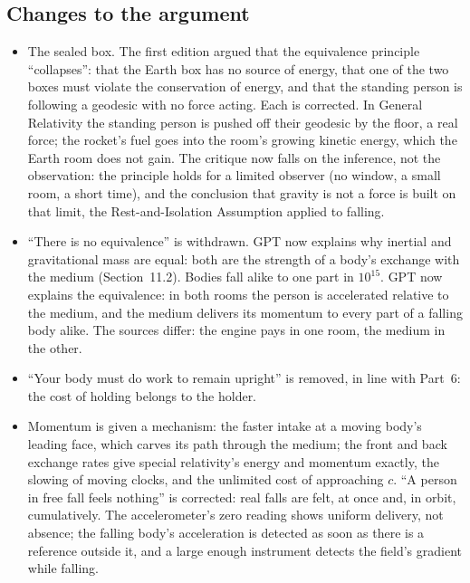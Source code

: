 \documentclass[11pt,a4paper]{article}
\begin{document}
\subsection*{Changes to the argument}
\begin{itemize}
  \item The sealed box. The first edition argued that the equivalence principle ``collapses'': that the Earth box has no source of energy, that one of the two boxes must violate the conservation of energy, and that the standing person is following a geodesic with no force acting. Each is corrected. In General Relativity the standing person is pushed off their geodesic by the floor, a real force; the rocket's fuel goes into the room's growing kinetic energy, which the Earth room does not gain. The critique now falls on the inference, not the observation: the principle holds for a limited observer (no window, a small room, a short time), and the conclusion that gravity is not a force is built on that limit, the Rest-and-Isolation Assumption applied to falling.
  \item ``There is no equivalence'' is withdrawn. GPT now explains why inertial and gravitational mass are equal: both are the strength of a body's exchange with the medium (Section~11.2). Bodies fall alike to one part in $10^{15}$. GPT now explains the equivalence: in both rooms the person is accelerated relative to the medium, and the medium delivers its momentum to every part of a falling body alike. The sources differ: the engine pays in one room, the medium in the other.
  \item ``Your body must do work to remain upright'' is removed, in line with Part~6: the cost of holding belongs to the holder.
  \item Momentum is given a mechanism: the faster intake at a moving body's leading face, which carves its path through the medium; the front and back exchange rates give special relativity's energy and momentum exactly, the slowing of moving clocks, and the unlimited cost of approaching $c$. ``A person in free fall feels nothing'' is corrected: real falls are felt, at once and, in orbit, cumulatively. The accelerometer's zero reading shows uniform delivery, not absence; the falling body's acceleration is detected as soon as there is a reference outside it, and a large enough instrument detects the field's gradient while falling.

\end{itemize}
\end{document}
